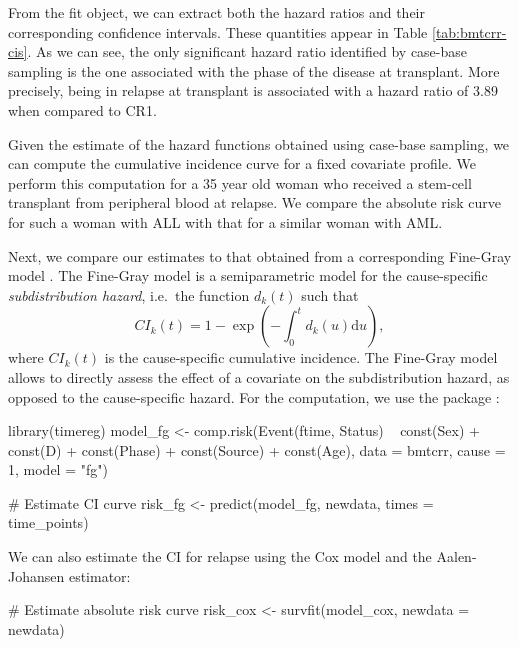 From the fit object, we can extract both the hazard ratios and their
corresponding confidence intervals. These quantities appear in Table
\ref{tab:bmtcrr-cis}. As we can see, the only significant hazard ratio
identified by case-base sampling is the one associated with the phase of
the disease at transplant. More precisely, being in relapse at
transplant is associated with a hazard ratio of 3.89 when compared to
CR1.

Given the estimate of the hazard functions obtained using case-base
sampling, we can compute the cumulative incidence curve for a fixed
covariate profile. We perform this computation for a 35 year old woman
who received a stem-cell transplant from peripheral blood at relapse. We
compare the absolute risk curve for such a woman with ALL with that for
a similar woman with AML.

Next, we compare our estimates to that obtained from a corresponding
Fine-Gray model \citeyearpar{fine1999proportional}. The Fine-Gray model
is a semiparametric model for the cause-specific \emph{subdistribution
hazard}, i.e.~the function \(d_k(t)\) such that
\[CI_k(t) =1 - \exp\left( - \int_0^t d_k(u) \textrm{d}u \right),\] where
\(CI_k(t)\) is the cause-specific cumulative incidence. The Fine-Gray
model allows to directly assess the effect of a covariate on the
subdistribution hazard, as opposed to the cause-specific hazard. For the
computation, we use the  package \citep{timereg}:

\begin{Schunk}
\begin{Sinput}
library(timereg)
model_fg <- comp.risk(Event(ftime, Status) ~ const(Sex) + const(D) +
                        const(Phase) + const(Source) + const(Age),
                      data = bmtcrr, cause = 1, model = "fg")

# Estimate CI curve
risk_fg <- predict(model_fg, newdata, times = time_points)
\end{Sinput}
\end{Schunk}

We can also estimate the CI for relapse using the Cox model and the
Aalen-Johansen estimator:

\begin{Schunk}
\begin{Sinput}
# Estimate absolute risk curve
risk_cox <- survfit(model_cox, newdata = newdata)
\end{Sinput}
\end{Schunk}

